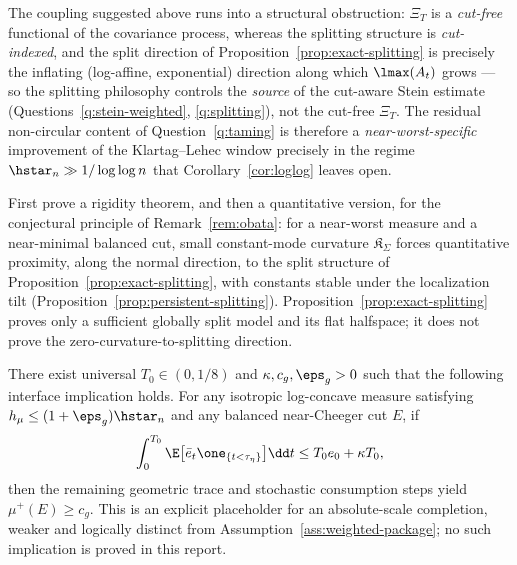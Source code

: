\documentclass[../../main.tex]{subfiles}
\begin{document}
\begin{remark}
\label{rem:taming-type-mismatch}
The coupling suggested above runs into a
structural obstruction: $\Xi_T$ is a \emph{cut-free} functional of the covariance process,
whereas the splitting structure is \emph{cut-indexed}, and the split direction of
Proposition~\ref{prop:exact-splitting} is precisely the inflating (log-affine, exponential)
direction along which $\lmax(A_t)$ grows --- so the splitting philosophy controls the
\emph{source} of the cut-aware Stein estimate (Questions~\ref{q:stein-weighted},
\ref{q:splitting}), not the cut-free $\Xi_T$. The residual non-circular content of
Question~\ref{q:taming} is therefore a \emph{near-worst-specific} improvement of the
Klartag--Lehec window precisely in the regime $\hstar_n\gg1/\log\log n$ that
Corollary~\ref{cor:loglog} leaves open.
\end{remark}

\begin{question}
\label{q:splitting}
First prove a rigidity theorem, and then a quantitative version, for the conjectural principle
of Remark~\ref{rem:obata}: for a
near-worst measure and a near-minimal balanced cut, small constant-mode curvature
$\mathfrak K_\Sigma$ forces quantitative proximity, along the normal direction, to the split
structure of Proposition~\ref{prop:exact-splitting}, with constants stable under the
localization tilt (Proposition~\ref{prop:persistent-splitting}). Proposition~\ref{prop:exact-splitting}
proves only a sufficient globally split model and its flat halfspace; it does not prove the
zero-curvature-to-splitting direction.
\end{question}

\begin{hypothesis}
\label{hyp:absolute-geometric-completion}
There exist universal $T_0\in(0,1/8)$ and $\kappa,c_g,\eps_g>0$ such that the following interface implication
holds. For any isotropic log-concave measure satisfying
$h_\mu\le(1+\eps_g)\hstar_n$ and any balanced near-Cheeger cut $E$, if
\[
  \int_0^{T_0}\E\bigl[\bar e_t\one_{\{t<\tau_\eta\}}\bigr]\dd t
  \le T_0e_0+\kappa T_0,
\]
then the remaining geometric trace and stochastic consumption steps yield
$\mu^+(E)\ge c_g$. This is an explicit placeholder for an absolute-scale completion, weaker
and logically distinct from Assumption~\ref{ass:weighted-package}; no such implication is proved
in this report.
\end{hypothesis}
\end{document}
